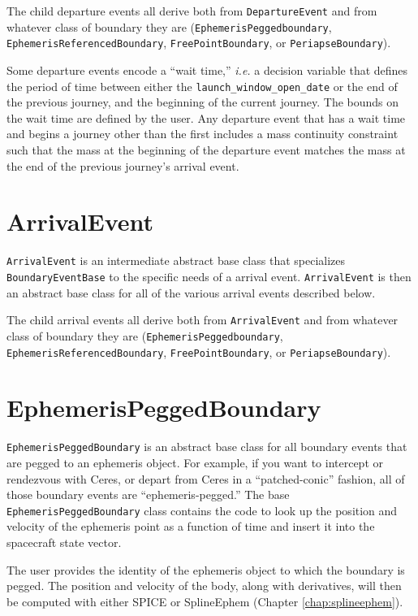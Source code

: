 The child departure events all derive both from \texttt{DepartureEvent} and from whatever class of boundary they are (\texttt{EphemerisPeggedboundary}, \texttt{EphemerisReferencedBoundary}, \texttt{FreePointBoundary}, or \texttt{PeriapseBoundary}).

Some departure events encode a ``wait time,'' \textit{i.e.} a decision variable that defines the period of time between either the \texttt{launch\_window\_open\_date} or the end of the previous journey, and the beginning of the current journey. The bounds on the wait time are defined by the user. Any departure event that has a wait time and begins a journey other than the first includes a mass continuity constraint such that the mass at the beginning of the departure event matches the mass at the end of the previous journey's arrival event.

\section{ArrivalEvent}
\label{sec:arrivalevent}

\texttt{ArrivalEvent} is an intermediate abstract base class that specializes \texttt{BoundaryEventBase} to the specific needs of a arrival event. \texttt{ArrivalEvent} is then an abstract base class for all of the various arrival events described below.

The child arrival events all derive both from \texttt{ArrivalEvent} and from whatever class of boundary they are (\texttt{EphemerisPeggedboundary}, \texttt{EphemerisReferencedBoundary}, \texttt{FreePointBoundary}, or \texttt{PeriapseBoundary}).

\clearpage
\section{EphemerisPeggedBoundary}
\label{sec:ephemerispeggedboundary}

\texttt{EphemerisPeggedBoundary} is an abstract base class for all boundary events that are pegged to an ephemeris object. For example, if you want to intercept or rendezvous with Ceres, or depart from Ceres in a ``patched-conic'' fashion, all of those boundary events are ``ephemeris-pegged.'' The base \texttt{EphemerisPeggedBoundary} class contains the code to look up the position and velocity of the ephemeris point as a function of time and insert it into the spacecraft state vector.

The user provides the identity of the ephemeris object to which the boundary is pegged. The position and velocity of the body, along with derivatives, will then be computed with either SPICE or SplineEphem (Chapter \ref{chap:splineephem}).

